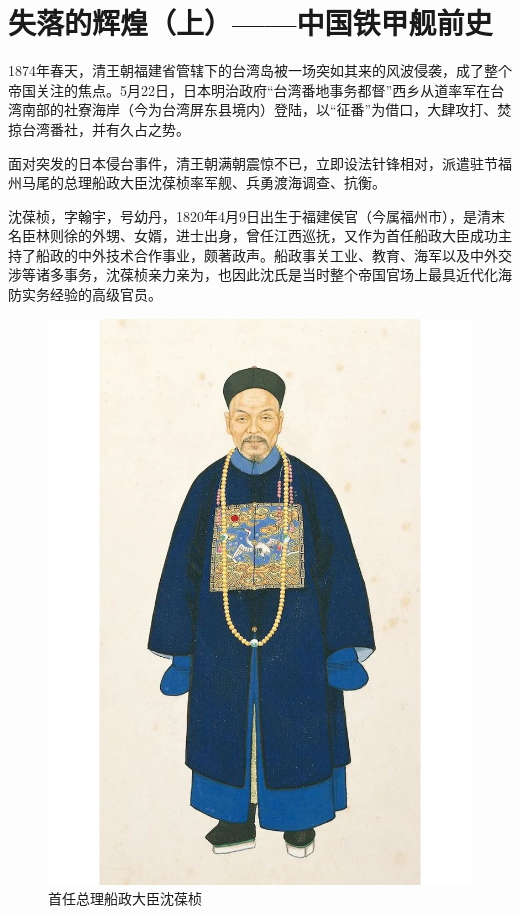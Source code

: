 \documentclass[12pt,UTF8]{ctexbook}
\begin{document}
\chapter{失落的辉煌（上）——中国铁甲舰前史}

1874年春天，清王朝福建省管辖下的台湾岛被一场突如其来的风波侵袭，成了整个帝国关注的焦点。5月22日，日本明治政府“台湾番地事务都督”西乡从道率军在台湾南部的社寮海岸（今为台湾屏东县境内）登陆，以“征番”为借口，大肆攻打、焚掠台湾番社，并有久占之势。

面对突发的日本侵台事件，清王朝满朝震惊不已，立即设法针锋相对，派遣驻节福州马尾的总理船政大臣沈葆桢率军舰、兵勇渡海调查、抗衡。

沈葆桢，字翰宇，号幼丹，1820年4月9日出生于福建侯官（今属福州市），是清末名臣林则徐的外甥、女婿，进士出身，曾任江西巡抚，又作为首任船政大臣成功主持了船政的中外技术合作事业，颇著政声。船政事关工业、教育、海军以及中外交涉等诸多事务，沈葆桢亲力亲为，也因此沈氏是当时整个帝国官场上最具近代化海防实务经验的高级官员。

\begin{figure}[htbp]
	\centering
	\includegraphics[width=1\linewidth]{Images/40}
	\caption{首任总理船政大臣沈葆桢}
	\label{fig:1}
\end{figure}
\end{document}
